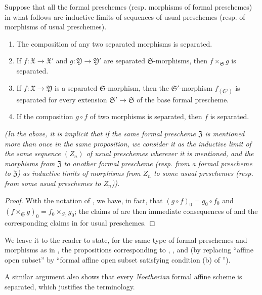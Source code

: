 \begin{proposition}[10.15.3]
\label{I.10.15.3}
Suppose that all the formal preschemes (resp. morphisms of formal preschemes) in what follows are inductive limits of sequences of usual preschemes (resp. of morphisms of usual preschemes).
\begin{enumerate}
    \item[\rm{(i)}] The composition of any two separated morphisms is separated.
    \item[\rm{(ii)}] If $f:\mathfrak{X}\to\mathfrak{X}'$ and $g:\mathfrak{Y}\to\mathfrak{Y}'$ are separated $\mathfrak{S}$-morphisms, then $f\times_\mathfrak{S}g$ is separated.
    \item[\rm{(iii)}] If $f:\mathfrak{X}\to\mathfrak{Y}$ is a separated $\mathfrak{S}$-morphism, then the $\mathfrak{S}'$-morphism $f_{(\mathfrak{S}')}$ is separated for every extension $\mathfrak{S}'\to\mathfrak{S}$ of the base formal prescheme.
    \item[\rm{(iv)}] If the composition $g\circ f$ of two morphisms is separated, then $f$ is separated.
\end{enumerate}
\emph{(In the above, it is implicit that if the same formal prescheme $\mathfrak{Z}$ is mentioned more than once in the same proposition, we consider it as the inductive limit of the \emph{same} sequence $(Z_n)$ of usual preschemes wherever it is mentioned, and the morphisms from $\mathfrak{Z}$ to another formal prescheme (resp. from a formal prescheme to $\mathfrak{Z}$) as inductive limits of morphisms from $Z_n$ to some usual preschemes (resp. from some usual preschemes to $Z_n$)).}
\end{proposition}

\begin{proof}
With the notation of , we have, in fact, that $(g\circ f)_0=g_0\circ f_0$ and $(f\times_\mathfrak{S}g)_0=f_0\times_{S_0}g_0$;
the claims of  are then immediate consequences of  and the corresponding claims in  for usual preschemes.
\end{proof}

We leave it to the reader to state, for the same type of formal preschemes and morphisms as in , the propositions corresponding to , , and 
(by replacing ``affine open subset'' by ``formal affine open subset satisfying condition (b) of '').

A similar argument also shows that every \emph{Noetherian} formal affine scheme is separated, which justifies the terminology.

